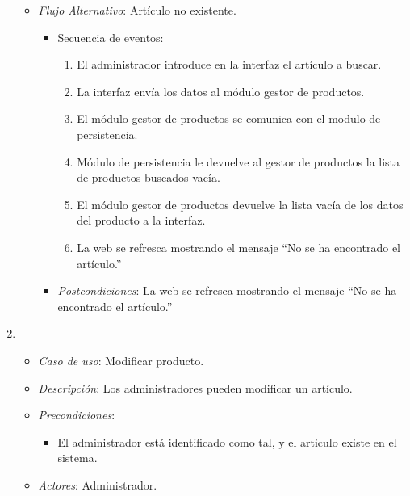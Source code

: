 \begin{enumerate}[{\bf UC-1}]
\begin{itemize}

  \item {\it Flujo Alternativo}: Artículo no existente.
\begin{itemize}
\item Secuencia de eventos:
    \begin{enumerate}[1. ]
    \item El administrador introduce en la interfaz el artículo a buscar.
    \item La interfaz envía los datos al módulo gestor de productos.
    \item El módulo gestor de productos se comunica con el modulo de persistencia.
    \item Módulo de persistencia le devuelve al gestor de productos la lista de productos buscados vacía.
    \item El módulo gestor de productos devuelve la lista vacía de los datos del producto a la interfaz.
    \item La web se refresca mostrando el mensaje ``No se ha encontrado el artículo.''
    \end{enumerate}
    \item {\it Postcondiciones}: La web se refresca mostrando el mensaje ``No se ha encontrado el artículo.''
\end{itemize}


  \end{itemize}

\item 
  \begin{itemize}
  \item {\it Caso de uso}: Modificar producto.
  \item {\it Descripción}: Los administradores pueden modificar un artículo.
  \item {\it Precondiciones}: 
    \begin{itemize}
    \item El administrador está identificado como tal, y el articulo existe en el sistema.
    \end{itemize}


  \item {\it Actores}: Administrador.


\end{itemize}
\end{enumerate}
